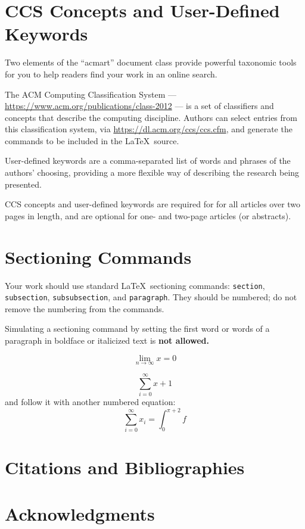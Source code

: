 \documentclass[sigconf,natbib=false]{acmart}
\begin{document}
\section{CCS Concepts and User-Defined Keywords}

Two elements of the ``acmart'' document class provide powerful
taxonomic tools for you to help readers find your work in an online
search.

The ACM Computing Classification System ---
\url{https://www.acm.org/publications/class-2012} --- is a set of
classifiers and concepts that describe the computing
discipline. Authors can select entries from this classification
system, via \url{https://dl.acm.org/ccs/ccs.cfm}, and generate the
commands to be included in the \LaTeX\ source.

User-defined keywords are a comma-separated list of words and phrases
of the authors' choosing, providing a more flexible way of describing
the research being presented.

CCS concepts and user-defined keywords are required for for all
articles over two pages in length, and are optional for one- and
two-page articles (or abstracts)\cite{igarashi2005lightweight}.

\section{Sectioning Commands}

Your work should use standard \LaTeX\ sectioning commands:
\verb|section|, \verb|subsection|, \verb|subsubsection|, and
\verb|paragraph|. They should be numbered; do not remove the numbering
from the commands.

Simulating a sectioning command by setting the first word or words of
a paragraph in boldface or italicized text is {\bfseries not allowed.}

\begin{equation}
  \lim_{n\rightarrow \infty}x=0
\end{equation}

\begin{displaymath}
  \sum_{i=0}^{\infty} x + 1
\end{displaymath}
and follow it with another numbered equation:
\begin{equation}
  \sum_{i=0}^{\infty}x_i=\int_{0}^{\pi+2} f
\end{equation}


\section{Citations and Bibliographies}


\section{Acknowledgments}

\printbibliography
\end{document}
